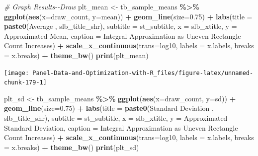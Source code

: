 \documentclass[
]{book}
\newenvironment{Shaded}{\begin{snugshade}}{\end{snugshade}}
\newcommand{\CommentTok}[1]{\textcolor[rgb]{0.56,0.35,0.01}{\textit{#1}}}
\newcommand{\DataTypeTok}[1]{\textcolor[rgb]{0.13,0.29,0.53}{#1}}
\newcommand{\FloatTok}[1]{\textcolor[rgb]{0.00,0.00,0.81}{#1}}
\newcommand{\KeywordTok}[1]{\textcolor[rgb]{0.13,0.29,0.53}{\textbf{#1}}}
\newcommand{\NormalTok}[1]{#1}
\newcommand{\OperatorTok}[1]{\textcolor[rgb]{0.81,0.36,0.00}{\textbf{#1}}}
\newcommand{\StringTok}[1]{\textcolor[rgb]{0.31,0.60,0.02}{#1}}
\begin{document}
\begin{Shaded}
\begin{Highlighting}[]
\CommentTok{\# Graph Results{-}{-}Draw}
\NormalTok{plt\_mean \textless{}{-}}\StringTok{ }\NormalTok{tb\_sample\_means }\OperatorTok{\%\textgreater{}\%}
\StringTok{  }\KeywordTok{ggplot}\NormalTok{(}\KeywordTok{aes}\NormalTok{(}\DataTypeTok{x=}\NormalTok{draw\_count, }\DataTypeTok{y=}\NormalTok{mean)) }\OperatorTok{+}
\StringTok{  }\KeywordTok{geom\_line}\NormalTok{(}\DataTypeTok{size=}\FloatTok{0.75}\NormalTok{) }\OperatorTok{+}
\StringTok{  }\KeywordTok{labs}\NormalTok{(}\DataTypeTok{title =} \KeywordTok{paste0}\NormalTok{(}\StringTok{\textquotesingle{}Average \textquotesingle{}}\NormalTok{, slb\_title\_shr),}
       \DataTypeTok{subtitle =}\NormalTok{ st\_subtitle,}
       \DataTypeTok{x =}\NormalTok{ slb\_xtitle,}
       \DataTypeTok{y =} \StringTok{\textquotesingle{}Approximated Mean\textquotesingle{}}\NormalTok{,}
       \DataTypeTok{caption =} \StringTok{\textquotesingle{}Integral Approximation as Uneven Rectangle Count Increases\textquotesingle{}}\NormalTok{) }\OperatorTok{+}
\StringTok{  }\KeywordTok{scale\_x\_continuous}\NormalTok{(}\DataTypeTok{trans=}\StringTok{\textquotesingle{}log10\textquotesingle{}}\NormalTok{, }\DataTypeTok{labels =}\NormalTok{ x.labels, }\DataTypeTok{breaks =}\NormalTok{ x.breaks) }\OperatorTok{+}
\StringTok{  }\KeywordTok{theme\_bw}\NormalTok{()}
\KeywordTok{print}\NormalTok{(plt\_mean)}
\end{Highlighting}
\end{Shaded}

\begin{center}\texttt{[image: Panel-Data-and-Optimization-with-R\_files/figure-latex/unnamed-chunk-179-1]} \end{center}

\begin{Shaded}
\begin{Highlighting}[]
\NormalTok{plt\_sd \textless{}{-}}\StringTok{ }\NormalTok{tb\_sample\_means }\OperatorTok{\%\textgreater{}\%}
\StringTok{  }\KeywordTok{ggplot}\NormalTok{(}\KeywordTok{aes}\NormalTok{(}\DataTypeTok{x=}\NormalTok{draw\_count, }\DataTypeTok{y=}\NormalTok{sd)) }\OperatorTok{+}
\StringTok{  }\KeywordTok{geom\_line}\NormalTok{(}\DataTypeTok{size=}\FloatTok{0.75}\NormalTok{) }\OperatorTok{+}
\StringTok{  }\KeywordTok{labs}\NormalTok{(}\DataTypeTok{title =} \KeywordTok{paste0}\NormalTok{(}\StringTok{\textquotesingle{}Standard Deviation \textquotesingle{}}\NormalTok{, slb\_title\_shr),}
       \DataTypeTok{subtitle =}\NormalTok{ st\_subtitle,}
       \DataTypeTok{x =}\NormalTok{ slb\_xtitle,}
       \DataTypeTok{y =} \StringTok{\textquotesingle{}Approximated Standard Deviation\textquotesingle{}}\NormalTok{,}
       \DataTypeTok{caption =} \StringTok{\textquotesingle{}Integral Approximation as Uneven Rectangle Count Increases\textquotesingle{}}\NormalTok{) }\OperatorTok{+}
\StringTok{  }\KeywordTok{scale\_x\_continuous}\NormalTok{(}\DataTypeTok{trans=}\StringTok{\textquotesingle{}log10\textquotesingle{}}\NormalTok{, }\DataTypeTok{labels =}\NormalTok{ x.labels, }\DataTypeTok{breaks =}\NormalTok{ x.breaks) }\OperatorTok{+}
\StringTok{  }\KeywordTok{theme\_bw}\NormalTok{()}
\KeywordTok{print}\NormalTok{(plt\_sd)}
\end{Highlighting}
\end{Shaded}
\end{document}
